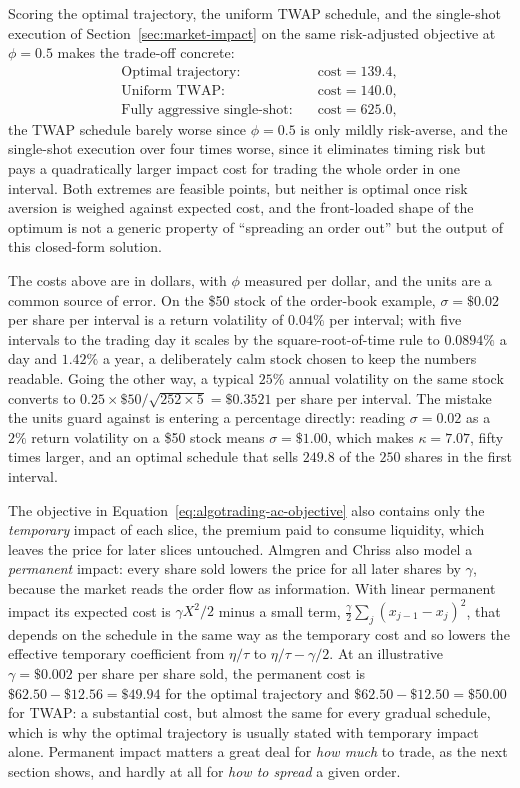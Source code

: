 \documentclass[../ai_in_finance]{subfiles}
\begin{document}
Scoring the optimal trajectory, the uniform TWAP schedule, and the single-shot execution of Section~\ref{sec:market-impact} on the same risk-adjusted objective at $\phi=0.5$ makes the trade-off concrete:
\begin{align*}
\text{Optimal trajectory:} &\quad \text{cost} = 139.4, \\
\text{Uniform TWAP:} &\quad \text{cost} = 140.0, \\
\text{Fully aggressive single-shot:} &\quad \text{cost} = 625.0,
\end{align*}
the TWAP schedule barely worse since $\phi=0.5$ is only mildly risk-averse, and the single-shot execution over four times worse, since it eliminates timing risk but pays a quadratically larger impact cost for trading the whole order in one interval. Both extremes are feasible points, but neither is optimal once risk aversion is weighed against expected cost, and the front-loaded shape of the optimum is not a generic property of ``spreading an order out'' but the output of this closed-form solution.

The costs above are in dollars, with $\phi$ measured per dollar, and the units are a common source of error. On the \$50 stock of the order-book example, $\sigma=\$0.02$ per share per interval is a return volatility of $0.04\%$ per interval; with five intervals to the trading day it scales by the square-root-of-time rule to $0.0894\%$ a day and $1.42\%$ a year, a deliberately calm stock chosen to keep the numbers readable. Going the other way, a typical $25\%$ annual volatility on the same stock converts to $0.25\times\$50/\sqrt{252\times5}=\$0.3521$ per share per interval. The mistake the units guard against is entering a percentage directly: reading $\sigma=0.02$ as a $2\%$ return volatility on a \$50 stock means $\sigma=\$1.00$, which makes $\kappa=7.07$, fifty times larger, and an optimal schedule that sells $249.8$ of the $250$ shares in the first interval.

The objective in Equation~\eqref{eq:algotrading-ac-objective} also contains only the \emph{temporary} impact of each slice, the premium paid to consume liquidity, which leaves the price for later slices untouched. Almgren and Chriss also model a \emph{permanent} impact: every share sold lowers the price for all later shares by $\gamma$, because the market reads the order flow as information. With linear permanent impact its expected cost is $\gamma X^2/2$ minus a small term, $\tfrac{\gamma}{2}\sum_j(x_{j-1}-x_j)^2$, that depends on the schedule in the same way as the temporary cost and so lowers the effective temporary coefficient from $\eta/\tau$ to $\eta/\tau-\gamma/2$. At an illustrative $\gamma=\$0.002$ per share per share sold, the permanent cost is $\$62.50-\$12.56=\$49.94$ for the optimal trajectory and $\$62.50-\$12.50=\$50.00$ for TWAP: a substantial cost, but almost the same for every gradual schedule, which is why the optimal trajectory is usually stated with temporary impact alone. Permanent impact matters a great deal for \emph{how much} to trade, as the next section shows, and hardly at all for \emph{how to spread} a given order.
\end{document}
